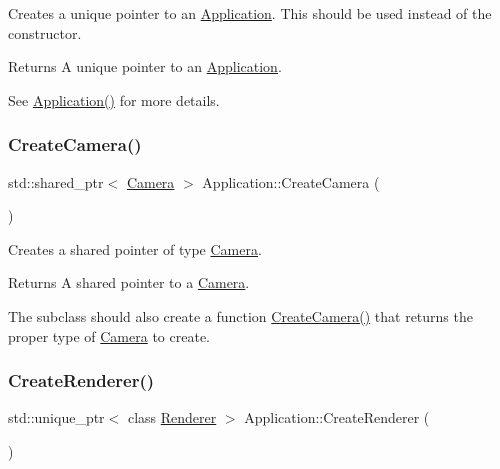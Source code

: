 Creates a unique pointer to an \hyperlink{class_application}{Application}. This should be used instead of the constructor.

\begin{DoxyReturn}{Returns}
A unique pointer to an \hyperlink{class_application}{Application}.
\end{DoxyReturn}
See \hyperlink{class_application_a78cdcb03e6f06272f7c528fe407951c5}{Application()} for more details. \hypertarget{class_application_a53c0a539fd2c4fe2cc48143cc0a3ea24}{}\label{class_application_a53c0a539fd2c4fe2cc48143cc0a3ea24}
\subsubsection{\texorpdfstring{Create\+Camera()}{CreateCamera()}}
{\footnotesize\ttfamily std\+::shared\+\_\+ptr$<$ \hyperlink{class_camera}{Camera} $>$ Application\+::\+Create\+Camera (\begin{DoxyParamCaption}{ }\end{DoxyParamCaption})\hspace{0.3cm}{\ttfamily [static]}}



Creates a shared pointer of type \hyperlink{class_camera}{Camera}.

\begin{DoxyReturn}{Returns}
A shared pointer to a \hyperlink{class_camera}{Camera}.
\end{DoxyReturn}
The subclass should also create a function \hyperlink{class_application_a53c0a539fd2c4fe2cc48143cc0a3ea24}{Create\+Camera()} that returns the proper type of \hyperlink{class_camera}{Camera} to create. \hypertarget{class_application_a90c7fd9ecb6c8923948078903d442919}{}\label{class_application_a90c7fd9ecb6c8923948078903d442919}
\subsubsection{\texorpdfstring{Create\+Renderer()}{CreateRenderer()}}
{\footnotesize\ttfamily std\+::unique\+\_\+ptr$<$ class \hyperlink{class_renderer}{Renderer} $>$ Application\+::\+Create\+Renderer (\begin{DoxyParamCaption}{ }\end{DoxyParamCaption})\hspace{0.3cm}{\ttfamily [virtual]}}



